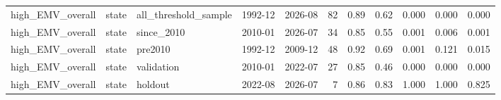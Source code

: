 \begin{table}
\begin{tabular}{lllllrrrrrr}
high\_EMV\_overall & state & all\_threshold\_sample & 1992-12 & 2026-08 & 82 & 0.89 & 0.62 & 0.000 & 0.000 & 0.000 \\
high\_EMV\_overall & state & since\_2010 & 2010-01 & 2026-07 & 34 & 0.85 & 0.55 & 0.001 & 0.006 & 0.001 \\
high\_EMV\_overall & state & pre2010 & 1992-12 & 2009-12 & 48 & 0.92 & 0.69 & 0.001 & 0.121 & 0.015 \\
high\_EMV\_overall & state & validation & 2010-01 & 2022-07 & 27 & 0.85 & 0.46 & 0.000 & 0.000 & 0.000 \\
high\_EMV\_overall & state & holdout & 2022-08 & 2026-07 & 7 & 0.86 & 0.83 & 1.000 & 1.000 & 0.825 \\
\bottomrule
\end{tabular}
\end{table}
